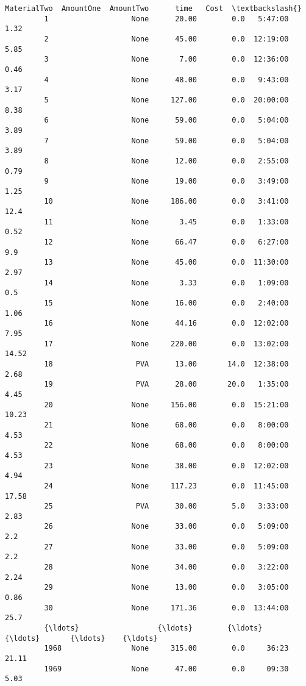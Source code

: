 \documentclass[11pt]{article}
\begin{document}
\begin{Verbatim}[commandchars=\\\{\}]
                      MaterialTwo  AmountOne  AmountTwo      time   Cost  \textbackslash{}
         1                   None      20.00        0.0   5:47:00   1.32   
         2                   None      45.00        0.0  12:19:00   5.85   
         3                   None       7.00        0.0  12:36:00   0.46   
         4                   None      48.00        0.0   9:43:00   3.17   
         5                   None     127.00        0.0  20:00:00   8.38   
         6                   None      59.00        0.0   5:04:00   3.89   
         7                   None      59.00        0.0   5:04:00   3.89   
         8                   None      12.00        0.0   2:55:00   0.79   
         9                   None      19.00        0.0   3:49:00   1.25   
         10                  None     186.00        0.0   3:41:00   12.4   
         11                  None       3.45        0.0   1:33:00   0.52   
         12                  None      66.47        0.0   6:27:00    9.9   
         13                  None      45.00        0.0  11:30:00   2.97   
         14                  None       3.33        0.0   1:09:00    0.5   
         15                  None      16.00        0.0   2:40:00   1.06   
         16                  None      44.16        0.0  12:02:00   7.95   
         17                  None     220.00        0.0  13:02:00  14.52   
         18                   PVA      13.00       14.0  12:38:00   2.68   
         19                   PVA      28.00       20.0   1:35:00   4.45   
         20                  None     156.00        0.0  15:21:00  10.23   
         21                  None      68.00        0.0   8:00:00   4.53   
         22                  None      68.00        0.0   8:00:00   4.53   
         23                  None      38.00        0.0  12:02:00   4.94   
         24                  None     117.23        0.0  11:45:00  17.58   
         25                   PVA      30.00        5.0   3:33:00   2.83   
         26                  None      33.00        0.0   5:09:00    2.2   
         27                  None      33.00        0.0   5:09:00    2.2   
         28                  None      34.00        0.0   3:22:00   2.24   
         29                  None      13.00        0.0   3:05:00   0.86   
         30                  None     171.36        0.0  13:44:00   25.7   
         {\ldots}                  {\ldots}        {\ldots}        {\ldots}       {\ldots}    {\ldots}   
         1968                None     315.00        0.0     36:23  21.11   
         1969                None      47.00        0.0     09:30   5.03   

\end{Verbatim}
\end{document}
